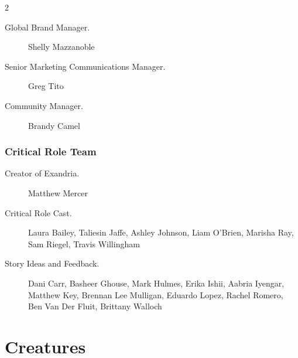 \documentclass[10pt,a4paper,twoside,bg=print,twocolumn,openany,nodeprecatedcode]{dndbook}
\begin{document}
\begin{description}
\begin{multicols}{2}
\begin{description}
\item[Global Brand Manager.]
Shelly Mazzanoble

\item[Senior Marketing Communications Manager.]
Greg Tito

\item[Community Manager.]
Brandy Camel

\end{description}

\subsection{Critical Role Team}

\begin{description}
\item[Creator of Exandria.]
Matthew Mercer

\item[Critical Role Cast.]
Laura Bailey, Taliesin Jaffe, Ashley Johnson, Liam O'Brien, Marisha Ray, Sam Riegel, Travis Willingham

\item[Story Ideas and Feedback.]
Dani Carr, Basheer Ghouse, Mark Hulmes, Erika Ishii, Aabria Iyengar, Matthew Key, Brennan Lee Mulligan, Eduardo Lopez, Rachel Romero, Ben Van Der Fluit, Brittany Walloch

\end{description}

\end{multicols}

\end{description}

\chapter{Creatures}
\pagestyle{empty}
\end{document}
